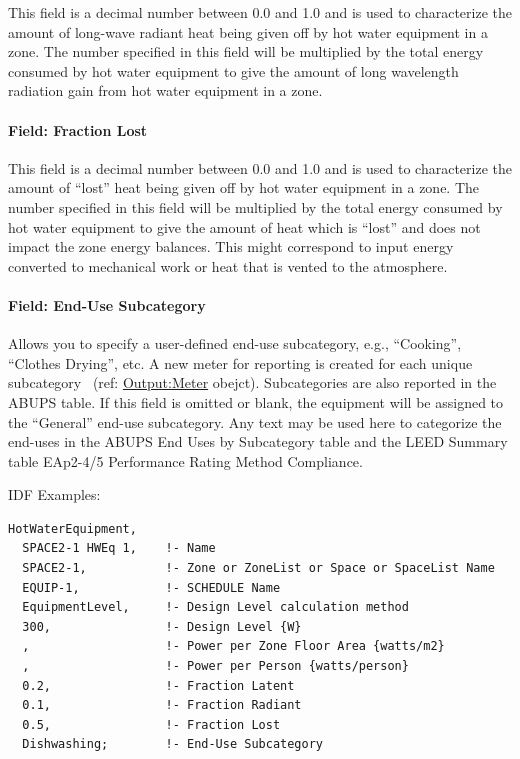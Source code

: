 This field is a decimal number between 0.0 and 1.0 and is used to characterize the amount of long-wave radiant heat being given off by hot water equipment in a zone. The number specified in this field will be multiplied by the total energy consumed by hot water equipment to give the amount of long wavelength radiation gain from hot water equipment in a zone.

\paragraph{Field: Fraction Lost}\label{field-fraction-lost-2}

This field is a decimal number between 0.0 and 1.0 and is used to characterize the amount of ``lost'' heat being given off by hot water equipment in a zone. The number specified in this field will be multiplied by the total energy consumed by hot water equipment to give the amount of heat which is ``lost'' and does not impact the zone energy balances. This might correspond to input energy converted to mechanical work or heat that is vented to the atmosphere.

\paragraph{Field: End-Use Subcategory}\label{field-end-use-subcategory-3-000}

Allows you to specify a user-defined end-use subcategory, e.g., ``Cooking'', ``Clothes Drying'', etc. A new meter for reporting is created for each unique subcategory~ (ref: \hyperref[outputmeter-and-outputmetermeterfileonly]{Output:Meter} obejct). Subcategories are also reported in the ABUPS table. If this field is omitted or blank, the equipment will be assigned to the ``General'' end-use subcategory. Any text may be used here to categorize the end-uses in the ABUPS End Uses by Subcategory table and the LEED Summary table EAp2-4/5 Performance Rating Method Compliance.

IDF Examples:

\begin{lstlisting}
HotWaterEquipment,
  SPACE2-1 HWEq 1,    !- Name
  SPACE2-1,           !- Zone or ZoneList or Space or SpaceList Name
  EQUIP-1,            !- SCHEDULE Name
  EquipmentLevel,     !- Design Level calculation method
  300,                !- Design Level {W}
  ,                   !- Power per Zone Floor Area {watts/m2}
  ,                   !- Power per Person {watts/person}
  0.2,                !- Fraction Latent
  0.1,                !- Fraction Radiant
  0.5,                !- Fraction Lost
  Dishwashing;        !- End-Use Subcategory
\end{lstlisting}

